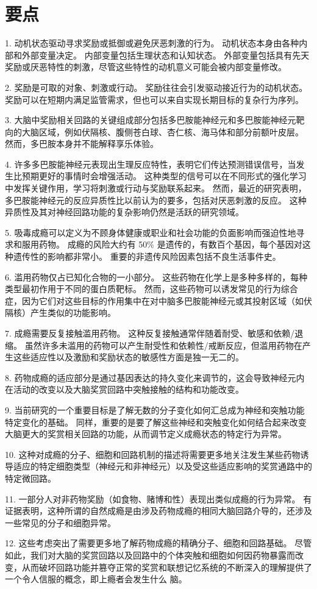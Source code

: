 \section{要点}

1. 动机状态驱动寻求奖励或抵御或避免厌恶刺激的行为。
动机状态本身由各种内部和外部变量决定。
内部变量包括生理状态和认知状态。
外部变量包括具有先天奖励或厌恶特性的刺激，尽管这些特性的动机意义可能会被内部变量修改。


2. 奖励是可取的对象、刺激或行动。
奖励往往会引发驱动接近行为的动机状态。
奖励可以在短期内满足监管需求，但也可以来自实现长期目标的复杂行为序列。


3. 大脑中奖励相关回路的关键组成部分包括多巴胺能神经元和多巴胺能神经元靶向的大脑区域，例如伏隔核、腹侧苍白球、杏仁核、海马体和部分前额叶皮层。
然而，多巴胺本身并不能解释享乐体验。 


4. 许多多巴胺能神经元表现出生理反应特性，表明它们传达预测错误信号，当发生比预期更好的事情时会增强活动。
这种类型的信号可以在不同形式的强化学习中发挥关键作用，学习将刺激或行动与奖励联系起来。
然而，最近的研究表明，多巴胺能神经元的反应异质性比以前认为的要多，包括对厌恶刺激的反应。
这种异质性及其对神经回路功能的复杂影响仍然是活跃的研究领域。


5. 吸毒成瘾可以定义为不顾身体健康或职业和社会功能的负面影响而强迫性地寻求和服用药物。
成瘾的风险大约有 50\% 是遗传的，有数百个基因，每个基因对这种遗传性的影响都非常小。
重要的非遗传风险因素包括不良生活事件史。


6. 滥用药物仅占已知化合物的一小部分。
这些药物在化学上是多种多样的，每种类型最初作用于不同的蛋白质靶标。
然而，这些药物可以诱发常见的行为综合症，因为它们对这些目标的作用集中在对中脑多巴胺能神经元或其投射区域（如伏隔核）产生类似的功能影响。


7. 成瘾需要反复接触滥用药物。
这种反复接触通常伴随着耐受、敏感和依赖/退缩。
虽然许多未滥用的药物可以产生耐受性和依赖性/戒断反应，但滥用药物在产生这些适应性以及激励和奖励状态的敏感性方面是独一无二的。


8. 药物成瘾的适应部分是通过基因表达的持久变化来调节的，这会导致神经元内在活动的改变以及大脑奖赏回路中突触接触的结构和功能改变。


9. 当前研究的一个重要目标是了解无数的分子变化如何汇总成为神经和突触功能特定变化的基础。
同样，重要的是要了解这些神经和突触变化如何结合起来改变大脑更大的奖赏相关回路的功能，从而调节定义成瘾状态的特定行为异常。


10. 这种对成瘾的分子、细胞和回路机制的描述将需要更多地关注发生某些药物诱导适应的特定细胞类型（神经元和非神经元）以及受这些适应影响的奖赏通路中的特定微回路。


11. 一部分人对非药物奖励（如食物、赌博和性）表现出类似成瘾的行为异常。
有证据表明，这种所谓的自然成瘾是由涉及药物成瘾的相同大脑回路介导的，还涉及一些常见的分子和细胞异常。 


12. 这些考虑突出了需要更多地了解药物成瘾的精确分子、细胞和回路基础。
尽管如此，我们对大脑的奖赏回路以及回路中的个体突触和细胞如何因药物暴露而改变，从而破坏回路功能并篡夺正常的奖赏和联想记忆系统的不断深入的理解提供了一个令人信服的概念，即上瘾者会发生什么 脑。

